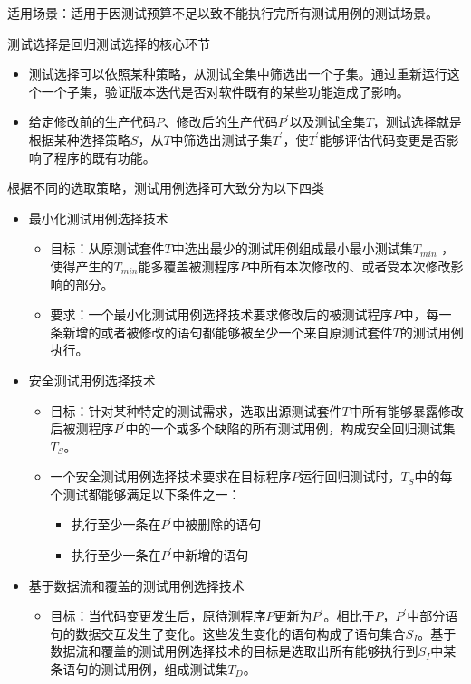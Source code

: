 适用场景：适用于因测试预算不足以致不能执行完所有测试用例的测试场景。

测试选择是回归测试选择的核心环节
\begin{itemize}
    \item 测试选择可以依照某种策略，从测试全集中筛选出一个子集。通过重新运行这个一个子集，验证版本迭代是否对软件既有的某些功能造成了影响。
    \item 给定修改前的生产代码$P$、修改后的生产代码$P^\prime$以及测试全集$T$，测试选择就是根据某种选择策略$S$，从$T$中筛选出测试子集$T^\prime$，使$T^\prime$能够评估代码变更是否影响了程序的既有功能。
\end{itemize}

根据不同的选取策略，测试用例选择可大致分为以下四类
\begin{itemize}
    \item 最小化测试用例选择技术
    \begin{itemize}
        \item 目标：从原测试套件$T$中选出最少的测试用例组成最小最小测试集$T_{min}$ ，使得产生的$T_{min}$能多覆盖被测程序$P$中所有本次修改的、或者受本次修改影响的部分。
        \item 要求：一个最小化测试用例选择技术要求修改后的被测试程序$P$中，每一条新增的或者被修改的语句都能够被至少一个来自原测试套件$T$的测试用例执行。
    \end{itemize}
    \item 安全测试用例选择技术
    \begin{itemize}
        \item 目标：针对某种特定的测试需求，选取出源测试套件$T$中所有能够暴露修改后被测程序$P^\prime$中的一个或多个缺陷的所有测试用例，构成安全回归测试集$T_S$。
        \item 一个安全测试用例选择技术要求在目标程序$P$运行回归测试时，$T_S$中的每个测试都能够满足以下条件之一：
        \begin{itemize}
            \item 执行至少一条在$P^\prime$中被删除的语句
            \item 执行至少一条在$P^\prime$中新增的语句
        \end{itemize}
    \end{itemize}
    \item 基于数据流和覆盖的测试用例选择技术
    \begin{itemize}
        \item 目标：当代码变更发生后，原待测程序$P$更新为$P^\prime$。相比于$P$，$P^\prime$中部分语句的数据交互发生了变化。这些发生变化的语句构成了语句集合$S_I$。基于数据流和覆盖的测试用例选择技术的目标是选取出所有能够执行到$S_I$中某条语句的测试用例，组成测试集$T_D$。

\end{itemize}
\end{itemize}
